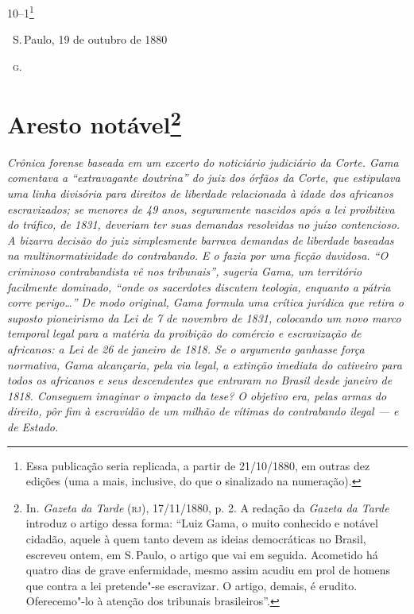 \smallskip

\noindent{}10--1\footnote{Essa publicação seria replicada, a partir de
  21/10/1880, em outras dez edições (uma a mais, inclusive, do que o
  sinalizado na numeração).}

\bigskip

\hfill\ S.\,Paulo, 19 de outubro de 1880\smallskip

\hfill\ \textsc{g.}

\chapter{Aresto notável\footnote[*]{In. \emph{Gazeta da Tarde} (\textsc{rj}),
  17/11/1880, p. 2. A redação da \emph{Gazeta da Tarde} introduz o
  artigo dessa forma: ``Luiz Gama, o muito conhecido e notável cidadão,
  aquele à quem tanto devem as ideias democráticas no Brasil, escreveu
  ontem, em S.\,Paulo, o artigo que vai em seguida. Acometido há quatro
  dias de grave enfermidade, mesmo assim acudiu em prol de homens que
  contra a lei pretende"-se escravizar. O artigo, demais, é erudito.
  Oferecemo"-lo à atenção dos tribunais brasileiros''.}}

\begin{flushleft}
{\footnotesize\itshape
Crônica forense baseada em um
excerto do noticiário judiciário da Corte. 
Gama comentava a ``extravagante doutrina'' do juiz dos
órfãos da Corte, que estipulava uma linha divisória para direitos de
liberdade relacionada à idade dos africanos escravizados; se menores de
49 anos, seguramente nascidos após a lei proibitiva do tráfico, de 1831,
deveriam ter suas demandas resolvidas no juízo contencioso. A bizarra
decisão do juiz simplesmente barrava demandas de liberdade baseadas na
multinormatividade do contrabando. E o fazia por uma ficção duvidosa. ``O
criminoso contrabandista vê nos tribunais'', sugeria Gama, um território
facilmente dominado, ``onde os sacerdotes discutem teologia, enquanto a
pátria corre perigo\ldots{}'' De modo original, Gama formula uma crítica
jurídica que retira o suposto pioneirismo da Lei de 7 de novembro de
1831, colocando um novo marco temporal legal para a matéria da
proibição do comércio e escravização de africanos: a Lei de 26 de
janeiro de 1818. Se o argumento ganhasse força normativa, Gama alcançaria, pela via
legal, a extinção imediata do cativeiro para todos os africanos e seus
descendentes que entraram no Brasil desde janeiro de 1818. Conseguem
imaginar o impacto da tese? O objetivo era, pelas armas do direito, pôr
fim à escravidão de um milhão de vítimas do contrabando ilegal --- e de
Estado. }
\end{flushleft}



